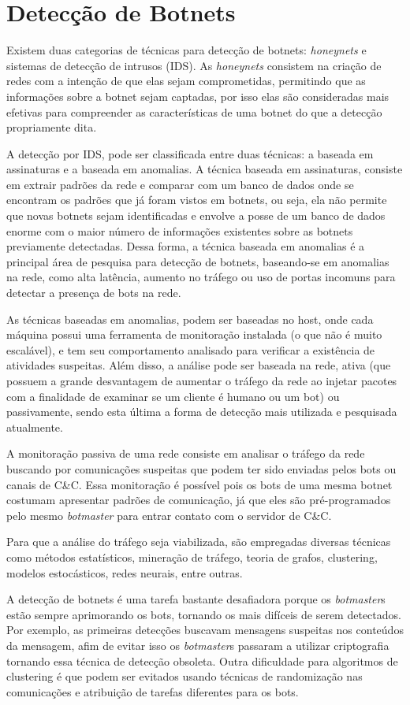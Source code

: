 \section{Detecção de Botnets}

Existem duas categorias de técnicas para detecção de botnets: \textit{honeynets} e sistemas de detecção de intrusos (IDS). As \textit{honeynets} consistem na criação de redes com a intenção de que elas sejam comprometidas, permitindo que as informações sobre a botnet sejam captadas, por isso elas são consideradas mais efetivas para compreender as características de uma botnet do que a detecção propriamente dita.

A detecção por IDS, pode ser classificada entre duas técnicas: a baseada em assinaturas e a baseada em anomalias. A técnica baseada em assinaturas, consiste em extrair padrões da rede e comparar com um banco de dados onde se encontram os padrões que já foram vistos em botnets, ou seja, ela não permite que novas botnets sejam identificadas e envolve a posse de um banco de dados enorme com o maior número de informações existentes sobre as botnets previamente detectadas. Dessa forma, a técnica baseada em anomalias é a principal área de pesquisa para detecção de botnets, baseando-se em anomalias na rede, como alta latência, aumento no tráfego ou uso de portas incomuns para detectar a presença de bots na rede.

As técnicas baseadas em anomalias, podem ser baseadas no host, onde cada máquina possui uma ferramenta de monitoração instalada (o que não é muito escalável), e tem seu comportamento analisado para verificar a existência de atividades suspeitas. Além disso, a análise pode ser baseada na rede, ativa (que possuem a grande desvantagem de aumentar o tráfego da rede ao injetar pacotes com a finalidade de examinar se um cliente é humano ou um bot) ou passivamente, sendo esta última a forma de detecção mais utilizada e pesquisada atualmente.

A monitoração passiva de uma rede consiste em analisar o tráfego da rede buscando por comunicações suspeitas que podem ter sido enviadas pelos bots ou canais de C\&C. Essa monitoração é possível pois os bots de uma mesma botnet costumam apresentar padrões de comunicação, já que eles são pré-programados pelo mesmo \textit{botmaster} para entrar contato com o servidor de C\&C.

Para que a análise do tráfego seja viabilizada, são empregadas diversas técnicas como métodos estatísticos, mineração de tráfego, teoria de grafos, clustering, modelos estocásticos, redes neurais, entre outras.

A detecção de botnets é uma tarefa bastante desafiadora porque os \textit{botmaster}s estão sempre aprimorando os bots, tornando os mais difíceis de serem detectados. Por exemplo, as primeiras detecções buscavam mensagens suspeitas nos conteúdos da mensagem, afim de evitar isso os \textit{botmaster}s passaram a utilizar criptografia tornando essa técnica de detecção obsoleta. Outra dificuldade para algoritmos de clustering é que podem ser evitados usando técnicas de randomização nas comunicações e atribuição de tarefas diferentes para os bots.

